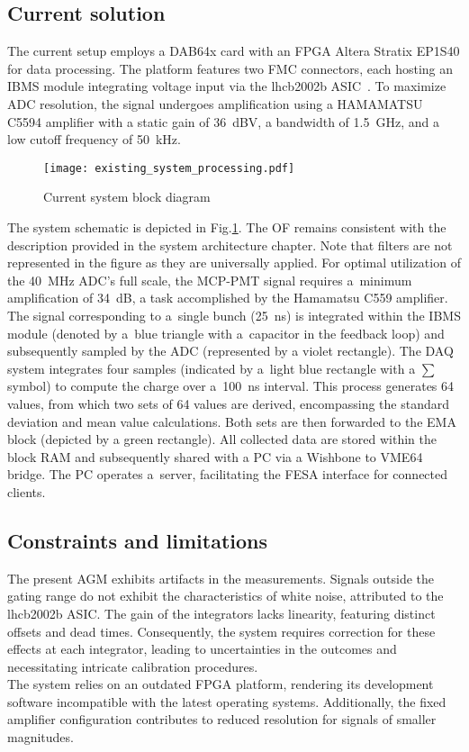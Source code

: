 \subsection{Current solution}
The current setup employs a DAB64x card with an FPGA Altera Stratix EP1S40 for
data processing. The platform features two FMC connectors, each hosting an IBMS
module integrating voltage input via the lhcb2002b ASIC~\cite{lhcb_asic}. To
maximize ADC resolution, the signal undergoes amplification using a HAMAMATSU
C5594 amplifier with a static gain of \SI{36}{dBV}, a bandwidth of
\SI{1.5}{GHz}, and a low cutoff frequency of \SI{50}{kHz}.
\begin{figure}[!tbh]
    \centering
    \texttt{[image: existing\_system\_processing.pdf]}
    \caption{Current system block diagram}
    \label{fig:current_system_processing}
\end{figure}
The system schematic is depicted in Fig.\ref{fig:current_system_processing}.
The OF remains consistent with the description provided
in the system architecture chapter. Note that filters are not represented in the
figure as they are universally applied. For optimal utilization of the \SI{40}{MHz}
ADC's full scale, the MCP-PMT signal requires a~minimum amplification of
\SI{34}{dB}, a task accomplished by the Hamamatsu C559
amplifier\cite{bsra_first_operation}.\\
The signal corresponding to a~single bunch (\SI{25}{ns})
is integrated within the IBMS module (denoted by a~blue triangle with a~capacitor in the feedback loop) and subsequently sampled by the ADC
(represented by a violet rectangle). The DAQ system integrates four samples
(indicated by a~light blue rectangle with a $\sum$ symbol) to compute the
charge over a~\SI{100}{ns} interval. This process generates 64 values, from
which two sets of 64 values are derived, encompassing the standard deviation
and mean value calculations. Both sets are then forwarded to the EMA block (depicted by a green rectangle). All collected data
are stored within the block RAM and subsequently shared with a PC via a
Wishbone to VME64 bridge. The PC operates a~server, facilitating the FESA
interface for connected clients.

\subsection{Constraints and limitations}
The present AGM exhibits artifacts in the measurements. Signals outside the
gating range do not exhibit the characteristics of white noise, attributed to
the lhcb2002b ASIC. The gain of the integrators lacks linearity, featuring distinct
offsets and dead times. Consequently, the system requires correction for
these effects at each integrator, leading to uncertainties in the outcomes and
necessitating intricate calibration procedures.\\
The system relies on an outdated FPGA platform, rendering its development
software incompatible with the latest operating systems. Additionally, the
fixed amplifier configuration contributes to reduced resolution for signals of
smaller magnitudes.

